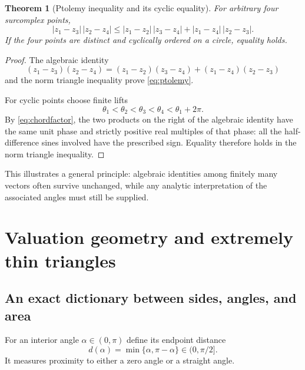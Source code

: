 \documentclass[11pt]{article}
\numberwithin{equation}{section}
\newtheorem{theorem}{Theorem}[section]
\theoremstyle{definition}
\begin{document}
\begin{theorem}[Ptolemy inequality and its cyclic equality]\label{thm:ptolemy}
For arbitrary four surcomplex points,
\begin{equation}\label{eq:ptolemy}
 |z_1-z_3|\,|z_2-z_4|
 \le |z_1-z_2|\,|z_3-z_4|+|z_1-z_4|\,|z_2-z_3|.
\end{equation}
If the four points are distinct and cyclically ordered on a circle, equality holds.
\end{theorem}
\begin{proof}
The algebraic identity
\[
 (z_1-z_3)(z_2-z_4)
 =(z_1-z_2)(z_3-z_4)+(z_1-z_4)(z_2-z_3)
\]
and the norm triangle inequality prove \eqref{eq:ptolemy}.

For cyclic points choose finite lifts
\[
 \theta_1<\theta_2<\theta_3<\theta_4<\theta_1+2\pi.
\]
By \eqref{eq:chordfactor}, the two products on the right of the algebraic identity have the same unit phase and strictly positive real multiples of that phase: all the half-difference sines involved have the prescribed sign. Equality therefore holds in the norm triangle inequality.
\end{proof}
This illustrates a general principle: algebraic identities among finitely many vectors often survive unchanged, while any analytic interpretation of the associated angles must still be supplied.

\section{Valuation geometry and extremely thin triangles}\label{sec:valuationgeometry}
\subsection{An exact dictionary between sides, angles, and area}
For an interior angle $\alpha\in(0,\pi)$ define its endpoint distance
\[
 d(\alpha)=\min\{\alpha,\pi-\alpha\}\in(0,\pi/2].
\]
It measures proximity to either a zero angle or a straight angle.
\end{document}
